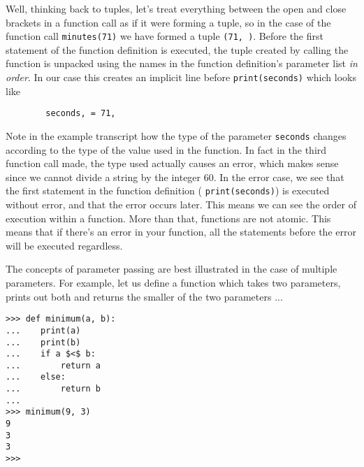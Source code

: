 Well, thinking back to tuples, let's treat everything between the   open and close brackets in a function call as if it were forming a   tuple, so in the case of the function call 
\texttt{minutes(71)} we   have formed a tuple \texttt{(71, )}. Before the first statement of the   function definition is executed, the tuple created by calling the   function is unpacked using the names in the function definition's   parameter list \textit{in order}. In our case this creates an   implicit line before 
\texttt{print(seconds)} which looks like
\begin{lstlisting}
		seconds, = 71,
\end{lstlisting}

Note in the example transcript how the type of the parameter   \texttt{seconds} changes according to the type of the value used in the   function. In fact in the third function call made, the type used   actually causes an error, which makes sense since we cannot divide a   string by the integer 60. In the error case, we see that the first   statement in the function definition (
\texttt{print(seconds)}) is   executed without error, and that the error occurs later. This means we can see the order of execution within a function.     More than that, functions are not atomic. This means that if there's an error in your function, all the      statements before the error will be executed regardless.

The concepts of parameter passing are best illustrated in the case   of multiple parameters. For example, let us define a function which   takes two parameters, prints out both and returns the smaller of the two parameters ...
\begin{lstlisting}
>>> def minimum(a, b):
...    print(a)
...    print(b)
...    if a $<$ b:
...        return a
...    else:
...        return b
...
>>> minimum(9, 3)
9
3
3
>>>
\end{lstlisting}

